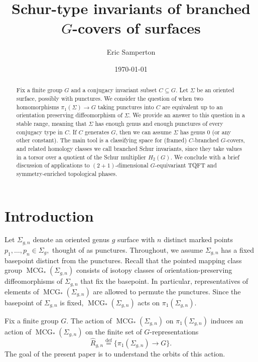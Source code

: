 \documentclass[10pt,twocolumn,amsmath,amssymb,aps,pra,secnumarabic,
    nofootinbib,groupedaddress]{revtex4-1}
\newcommand{\defeq}{\stackrel{\mathrm{def}}=}
\newcommand{\mcg}[1]{\operatorname{MCG}_*(\Sigma_{#1})}
\newcommand{\sfc}[1]{\Sigma_{#1}}
\newcommand{\hR}{\hat{R}}
\begin{document}
\title{Schur-type invariants of branched $G$-covers of surfaces}

\author{Eric Samperton}

\date{\today}

\begin{abstract}
Fix a finite group $G$ and a conjugacy invariant subset $C\subseteq G$.  Let $\Sigma$ be an oriented surface, possibly with punctures.  We consider the question of when two homomorphisms $\pi_1(\Sigma) \to G$ taking punctures into $C$ are equivalent up to an orientation preserving diffeomorphism of $\Sigma$.  We provide an answer to this question in a stable range, meaning that $\Sigma$ has enough genus and enough punctures of every conjugacy type in $C$.  If $C$ generates $G$, then we can assume $\Sigma$ has genus 0 (or any other constant).  The main tool is a classifying space for (framed) $C$-branched $G$-covers, and related homology classes we call branched Schur invariants, since they take values in a torsor over a quotient of the Schur multiplier $H_2(G)$.  We conclude with a brief discussion of applications to $(2+1)$-dimensional $G$-equivariant TQFT and symmetry-enriched topological phases.
\end{abstract}

\maketitle

\section{Introduction}
\label{s:intro}
Let $\sfc{g,n}$ denote an oriented genus $g$ surface with $n$ distinct marked points $p_1,\dots,p_n \in \sfc{g},$ thought of as punctures.  Throughout, we assume $\sfc{g,n}$ has a fixed basepoint distinct from the punctures.  Recall that the pointed mapping class group $\mcg{g,n}$ consists of isotopy classes of orientation-preserving diffeomorphisms of $\sfc{g,n}$ that fix the basepoint.  In particular, representatives of elements of $\mcg{g,n}$ are allowed to permute the punctures.  Since the basepoint of $\sfc{g,n}$ is fixed, $\mcg{g,n}$ acts on $\pi_1(\sfc{g,n})$.

Fix a finite group $G$.  The action of $\mcg{g,n}$ on $\pi_1(\sfc{g,n})$  induces an action of $\mcg{g,n}$ on the finite set of $G$-representations
\[ \hR_{g,n} \defeq \{ \pi_1(\sfc{g,n}) \to G \}. \]
The goal of the present paper is to understand the orbits of this action.
\end{document}
